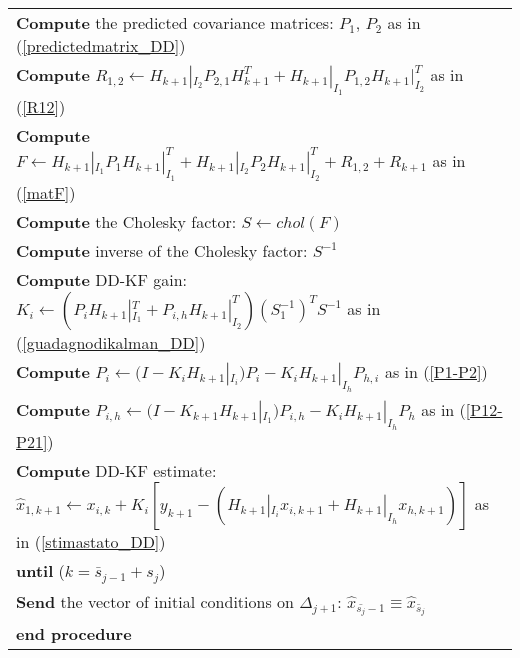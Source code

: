 \begin{table}[ht!]
\begin{tabular}{|l|}
\textbf{Compute} the predicted covariance matrices: $P_{1}$, $P_{2}$ as in (\ref{predictedmatrix_DD})\\
\textbf{Compute} $R_{1,2}\leftarrow H_{k+1}|_{I_{2}}P_{2,1}H_{k+1}^{T}+H_{k+1}|_{I_{1}}P_{1,2}H_{k+1}|_{I_{2}}^{T}$ as in (\ref{R12})\\
\textbf{Compute} $F\leftarrow H_{k+1}|_{I_{1}}P_{1}H_{k+1}|_{I_{1}}^{T}+H_{k+1}|_{I_{2}}P_{2}H_{k+1}|_{I_{2}}^{T}+R_{1,2}+R_{k+1}$ as in (\ref{matF})\\
\textbf{Compute} the Cholesky factor: $S\leftarrow chol(F)$\\
\textbf{Compute} inverse of the Cholesky factor: $S^{-1}$\\
\textbf{Compute}  DD-KF gain: $K_{i}\leftarrow (P_{i}H_{k+1}|_{I_{1}}^{T}+P_{i,h}H_{k+1}|_{I_{2}}^{T})(S_{1}^{-1})^{T}S^{-1}$ as in (\ref{guadagnodikalman_DD})\\
\textbf{Compute} $P_{i}\leftarrow (I-K_{i}H_{k+1}|_{I_{i}})P_{i}-K_{i}H_{k+1}|_{I_{h}}P_{h,i}$ as in (\ref{P1-P2})\\
\textbf{Compute} $P_{i,h} \leftarrow (I-K_{k+1}H_{k+1}|_{I_{1}})P_{i,h}-K_{i}H_{k+1}|_{I_{h}}P_{h}$ as in (\ref{P12-P21})\\
\textbf{Compute}  DD-KF estimate: $\widehat{x}_{1,k+1}\leftarrow x_{i,k}+K_{i}[y_{k+1}-(H_{k+1}|_{I_{i}}x_{i,k+1}+H_{k+1}|_{I_{h}}x_{h,k+1})]$ as in (\ref{stimastato_DD})\\
\textbf{until} ($k=\bar{s}_{j-1}+s_{j}$)\\
\textbf{Send} the vector of initial conditions on $\Delta_{j+1}$: $\widehat{x}_{\bar{s_{j}}-1}\equiv \widehat{x}_{\bar{s}_{j}}$\\
\textbf{end procedure} \\
\hline
\end{tabular}
\end{table}

